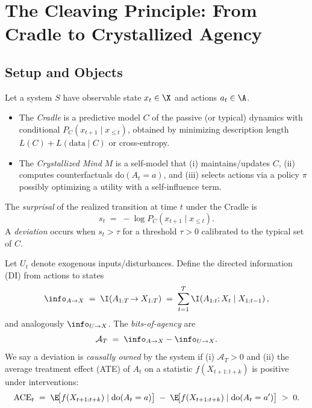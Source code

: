 \usepackage{amsmath,amsthm,amssymb,mathtools}
\usepackage{bm}
\usepackage{tikz}
\usepackage{tikz-cd}
\usepackage{algorithm}
\usepackage{algpseudocode}
\usepackage{listings}

\section{The Cleaving Principle: From Cradle to Crystallized Agency}

\subsection{Setup and Objects}
\begin{definition}
Let a system \(S\) have observable state \(x_t \in \X\) and actions \(a_t \in \A\).
\begin{itemize}
  \item The \emph{Cradle} is a predictive model \(C\) of the passive (or typical) dynamics with conditional \(P_C(x_{t+1}\mid x_{\le t})\), obtained by minimizing description length \(L(C)+L(\text{data}\mid C)\) or cross-entropy.
  \item The \emph{Crystallized Mind} \(M\) is a self-model that (i) maintains/updates \(C\), (ii) computes counterfactuals \(\mathrm{do}(A_t=a)\), and (iii) selects actions via a policy \(\pi\) possibly optimizing a utility with a self-influence term.
\end{itemize}
\end{definition}

\begin{definition}
The \emph{surprisal} of the realized transition at time \(t\) under the Cradle is
\[
s_t \;=\; -\log P_C(x_{t+1}\mid x_{\le t}) .
\]
A \emph{deviation} occurs when \(s_t>\tau\) for a threshold \(\tau>0\) calibrated to the typical set of \(C\).
\end{definition}

\begin{definition}
Let \(U_t\) denote exogenous inputs/disturbances. Define the directed information (DI) from actions to states
\[
\info_{A\to X} \;=\; \I(A_{1:T}\!\to X_{1:T}) \;=\; \sum_{t=1}^{T}\I\!\left(A_{1:t};X_t\mid X_{1:t-1}\right),
\]
and analogously \(\info_{U\to X}\). The \emph{bits-of-agency} are
\[
\mathcal{A}_T \;=\; \info_{A\to X}-\info_{U\to X}.
\]
We say a deviation is \emph{causally owned} by the system if (i) \(\mathcal{A}_T>0\) and (ii) the average treatment effect (ATE) of \(A_t\) on a statistic \(f(X_{t+1:t+k})\) is positive under interventions:
\[
\mathrm{ACE}_t \;=\; \E\!\big[f(X_{t+1:t+k})\mid \mathrm{do}(A_t=a)\big]
                 \;-\; \E\!\big[f(X_{t+1:t+k})\mid \mathrm{do}(A_t=a')\big] \;>\; 0.
\]
\end{definition}

